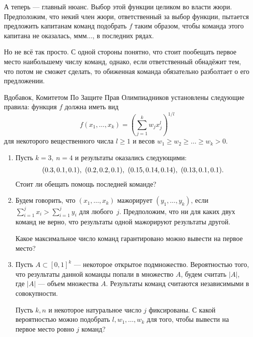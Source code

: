 А теперь --- главный нюанс. Выбор этой функции целиком во власти жюри. Предположим, что некий член жюри, ответственный за выбор функции, пытается предложить капитанам команд подобрать $f$ таким образом, чтобы команда этого капитана не оказалась, ммм..., в последних рядах. 

Но не всё так просто. С одной стороны понятно, что стоит пообещать первое место наибольшему числу команд, однако, если ответственный обнадёжит тем, что потом не сможет сделать, то обиженная команда обязательно разболтает о его предложении.

Вдобавок, Комитетом По Защите Прав Олимпиадников установлены следующие правила: функция $f$ должна иметь вид
$$
f(x_1,\dots,x_k) =\left (\sum\limits_{j = 1}^kw_jx_j^l  \right )^{1/l}
$$
для некоторого вещественного числа $l\geq 1$ и весов $w_1\geq w_2\geq\dots\geq w_k> 0$.


\bigskip
\begin{enumerate}
\item Пусть $k = 3,\ n = 4$ и результаты оказались следующими:
$$\bar{l}
(0.3,0.1,0.1),\ (0.2,0.2,0.1),\ (0.15, 0.14, 0.14),\ (0.13,0.1,0.1).
\ear$$
Стоит ли обещать помощь последней команде?

\item
 Будем говорить, что $(x_1,\dots, x_k)$ мажорирует $(y_1,\dots,y_k)$, если $\sum\limits_{i = 1}^jx_i > \sum\limits_{i = 1}^jy_i$ для любого~$j$. Предположим, что ни для каких двух команд не верно, что результаты одной мажорируют результаты другой.

Какое максимальное число команд гарантировано можно вывести на первое место?

\item Пусть $A\subset [0,1]^k$ --- некоторое открытое подмножество. Вероятностью того, что результаты данной команды попали в множество $A$, будем считать $|A|$, где $|A|$ --- объем множества $A$. Результаты команд считаются независимыми в совокупности.

Пусть $k,n$ и некоторое натуральное число $j$ фиксированы. С какой вероятностью можно подобрать $l,w_1,\dots, w_k$ для того, чтобы вывести на первое место ровно $j$ команд?

\end{enumerate}





